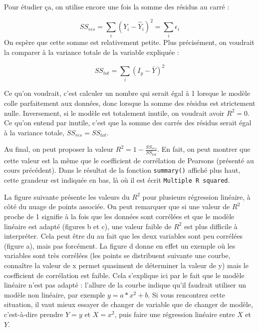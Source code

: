 \documentclass[
  french,
]{book}
\begin{document}
Pour étudier ça, on utilise encore une fois la somme des résidus au carré :

\[SS_{res} = \sum_{i} (Y_i - \hat{Y}_i)^2 = \sum_{i} \epsilon_i \] On espère que cette somme est relativement petite. Plus précisément, on voudrait la comparer à la variance totale de la variable expliquée :

\[SS_{tot} = \sum_i (I_y - \bar{Y})^2 \]

Ce qu'on voudrait, c'est calculer un nombre qui serait égal à 1 lorsque le modèle colle parfaitement aux données, donc lorsque la somme des résidus est strictement nulle. Inversement, si le modèle est totalement inutile, on voudrait avoir \(R^2 = 0\). Ce qu'on entend par inutile, c'est que la somme des carrés des résidus serait égal à la variance totale, \(SS_{res} = SS_{tot}\).

Au final, on peut proposer la valeur \(R^2 = 1 - \frac{SS_{res}}{SS_{tot}}\). En fait, on peut montrer que cette valeur est la même que le coefficient de corrélation de Pearsons (présenté au cours précédent). Dans le résultat de la fonction \texttt{summary()} affiché plus haut, cette grandeur est indiquée en bas, là où il est écrit \texttt{Multiple\ R\ squared}.

La figure suivante présente les valeurs du \(R^2\) pour plusieurs régression linéaire, à côté du nuage de points associée. On peut remarquer que si une valeur de \(R^2\) proche de 1 signifie à la fois que les données sont corrélées et que le modèle linéaire est adapté (figures b et c), une valeur faible de \(R^2\) est plus difficile à interpréter. Cela peut être du au fait que les deux variables sont peu corrélées (figure a), mais pas forcément. La figure d donne en effet un exemple où les variables sont très corrélées (les points se distribuent suivante une courbe, connaître la valeur de x permet quasiment de déterminer la valeur de y) mais le coefficient de corrélation est faible. Cela s'explique ici par le fait que le modèle linéaire n'est pas adapté : l'allure de la courbe indique qu'il faudrait utiliser un modèle non linéaire, par exemple \(y = a*x^2 + b\). Si vous rencontrez cette situation, il vaut mieux essayer de changer de variable que de changer de modèle, c'est-à-dire prendre \(Y=y\) et \(X=x^2\), puis faire une régression linéaire entre \(X\) et \(Y\).
\end{document}
